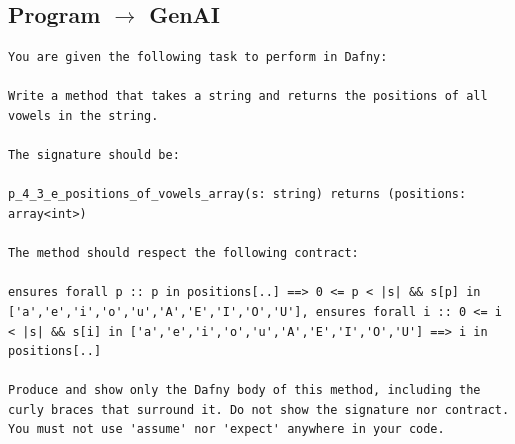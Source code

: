 \documentclass{article}
\begin{document}
\subsection*{Program $\rightarrow$ GenAI}
\begin{lstlisting}
You are given the following task to perform in Dafny:

Write a method that takes a string and returns the positions of all vowels in the string.

The signature should be:

p_4_3_e_positions_of_vowels_array(s: string) returns (positions: array<int>)

The method should respect the following contract:

ensures forall p :: p in positions[..] ==> 0 <= p < |s| && s[p] in ['a','e','i','o','u','A','E','I','O','U'], ensures forall i :: 0 <= i < |s| && s[i] in ['a','e','i','o','u','A','E','I','O','U'] ==> i in positions[..]

Produce and show only the Dafny body of this method, including the curly braces that surround it. Do not show the signature nor contract. You must not use 'assume' nor 'expect' anywhere in your code.
\end{lstlisting}
\end{document}
